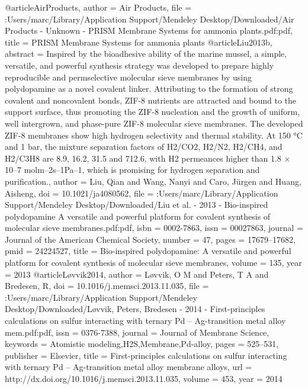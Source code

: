@article{AirProducts,
author = {{Air Products}},
file = {:Users/marc/Library/Application Support/Mendeley Desktop/Downloaded/Air Products - Unknown - PRISM {\textregistered} Membrane Systems for ammonia plants.pdf:pdf},
title = {{PRISM {\textregistered} Membrane Systems for ammonia plants}}
}
@article{Liu2013b,
abstract = {Inspired by the bioadhesive ability of the marine mussel, a simple, versatile, and powerful synthesis strategy was developed to prepare highly reproducible and permselective molecular sieve membranes by using polydopamine as a novel covalent linker. Attributing to the formation of strong covalent and noncovalent bonds, ZIF-8 nutrients are attracted and bound to the support surface, thus promoting the ZIF-8 nucleation and the growth of uniform, well intergrown, and phase-pure ZIF-8 molecular sieve membranes. The developed ZIF-8 membranes show high hydrogen selectivity and thermal stability. At 150 °C and 1 bar, the mixture separation factors of H2/CO2, H2/N2, H2/CH4, and H2/C3H8 are 8.9, 16.2, 31.5 and 712.6, with H2 permeances higher than 1.8 × 10–7 mol{\textperiodcentered}m–2{\textperiodcentered}s–1{\textperiodcentered}Pa–1, which is promising for hydrogen separation and purification.},
author = {Liu, Qian and Wang, Nanyi and Caro, J{\"{u}}rgen and Huang, Aisheng},
doi = {10.1021/ja4080562},
file = {:Users/marc/Library/Application Support/Mendeley Desktop/Downloaded/Liu et al. - 2013 - Bio-inspired polydopamine A versatile and powerful platform for covalent synthesis of molecular sieve membranes.pdf:pdf},
isbn = {0002-7863},
issn = {00027863},
journal = {Journal of the American Chemical Society},
number = {47},
pages = {17679--17682},
pmid = {24224527},
title = {{Bio-inspired polydopamine: A versatile and powerful platform for covalent synthesis of molecular sieve membranes}},
volume = {135},
year = {2013}
}
@article{Løvvik2014,
author = {L{\o}vvik, O M and Peters, T A and Bredesen, R},
doi = {10.1016/j.memsci.2013.11.035},
file = {:Users/marc/Library/Application Support/Mendeley Desktop/Downloaded/L{\o}vvik, Peters, Bredesen - 2014 - First-principles calculations on sulfur interacting with ternary Pd – Ag-transition metal alloy mem.pdf:pdf},
issn = {0376-7388},
journal = {Journal of Membrane Science},
keywords = {Atomistic modeling,H2S,Membrane,Pd-alloy},
pages = {525--531},
publisher = {Elsevier},
title = {{First-principles calculations on sulfur interacting with ternary Pd – Ag-transition metal alloy membrane alloys}},
url = {http://dx.doi.org/10.1016/j.memsci.2013.11.035},
volume = {453},
year = {2014}
}
